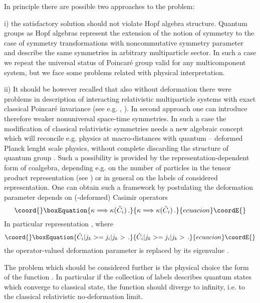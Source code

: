 \documentclass[a4paper,a4paper]{article}
\begin{document}
In principle there are possible two approaches to the problem:

 i) the satisfactory solution should not violate Hopf algebra
structure. Quantum groups as Hopf algebras represent the 
extension
of the notion of symmetry to the case of symmetry transformations
with noncommutative symmetry parameter and describe the same
symmetries in arbitrary multiparticle sector. In such a case we
repeat the universal status of Poincar\'{e} group valid for any
multicomponent system, but we face some problems related with
physical interpretation.

ii) It should be however recalled that also without deformation
there were problems in description of interacting relativistic
multiparticle systems with exact classical Poincar\'{e} invariance
(see e.g. \cite{cjs}, \cite{hl}). In second approach one can
introduce therefore weaker nonuniversal space-time symmetries. In
such a case the modification of classical relativistic symmetries
needs a new algebraic concept which will reconcile e.g. physics at
macro-distances  with quantum -- deformed Planck lenght scale
physics, without complete discarding the structure of quantum
group \cite{smaj}. Such a possibility is provided by the
representation-dependent form of coalgebra,  depending e.g. on the
number of particles in the tensor product representation (see
\cite{ms2}) or in general on the labels of considered
representation. One can obtain such a framework by postulating the
deformation parameter \myHighlight{$\kappa$}\coordHE{} depends on (\myHighlight{$\kappa$}\coordHE{}-deformed)
Casimir operators \coordHE{}
\begin{equation}\coord{}\boxEquation{\label{lupra4.1}
\kappa\Longrightarrow \kappa(\hat{C}_i)\, .
}{\kappa\Longrightarrow \kappa(\hat{C}_i)\, .
}{ecuacion}\coordE{}\end{equation}
In particular representation \coordHE{}, where
\begin{equation}\coord{}\boxEquation{\label{lupra4.2}
\hat{C}_i|{j_k}> = j_i |{j_k}>\, .
}{\hat{C}_i|{j_k}> = j_i |{j_k}>\, .
}{ecuacion}\coordE{}\end{equation}
the operator-valued deformation parameter \coordHE{} is
replaced by its eigenvalue \coordHE{}.

The problem which should be considered further is the physical
choice the form of the function \coordHE{}. In particular if
the collection of labels \coordHE{} describes quantum states which
converge to classical state, the function \coordHE{} should
diverge to infinity, i.e. to the classical relativistic
no-deformation limit.
\end{document}
